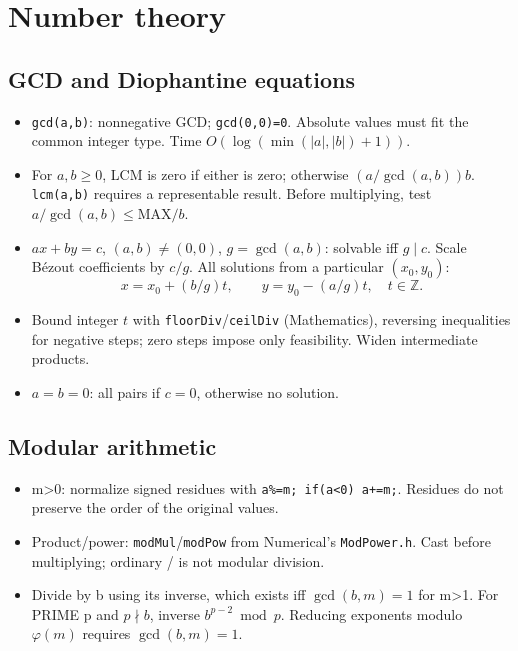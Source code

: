 \chapter{Number theory}

\section{GCD and Diophantine equations}
\begin{itemize}[nosep,leftmargin=*]
\item \texttt{gcd(a,b)}: nonnegative GCD; \texttt{gcd(0,0)=0}.
Absolute values must fit the common integer type.
Time $O(\log(\min(|a|,|b|)+1))$.
\item For $a,b\ge0$, LCM is zero if either is zero;
otherwise $(a/\gcd(a,b))b$.
\texttt{lcm(a,b)} requires a representable result.
Before multiplying, test $a/\gcd(a,b)\le\mathrm{MAX}/b$.
\end{itemize}
\begin{itemize}[nosep,leftmargin=*]
\item $ax+by=c$, $(a,b)\ne(0,0)$, $g=\gcd(a,b)$:
solvable iff $g\mid c$. Scale B\'ezout coefficients by $c/g$.
All solutions from a particular $(x_0,y_0)$:
\[
 x=x_0+(b/g)t,\qquad y=y_0-(a/g)t,\quad t\in\mathbb Z.
\]
\item Bound integer $t$ with \texttt{floorDiv}/\texttt{ceilDiv}
(Mathematics), reversing inequalities for negative steps;
zero steps impose only feasibility. Widen intermediate products.
\item $a=b=0$: all pairs if $c=0$, otherwise no solution.
\end{itemize}

\section{Modular arithmetic}
\begin{itemize}[nosep,leftmargin=*]
\item m>0: normalize signed residues with \texttt{a\%=m; if(a<0) a+=m;}.
Residues do not preserve the order of the original values.
\item Product/power: \texttt{modMul}/\texttt{modPow} from Numerical's
\texttt{ModPower.h}. Cast before multiplying; ordinary / is not modular division.
\item Divide by b using its inverse, which exists iff $\gcd(b,m)=1$ for m>1.
For PRIME p and $p\nmid b$, inverse $b^{p-2}\bmod p$.
Reducing exponents modulo $\varphi(m)$ requires $\gcd(b,m)=1$.
\end{itemize}

